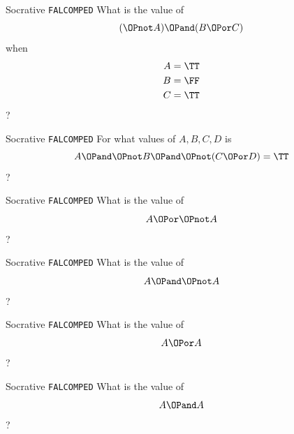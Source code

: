\begin{frame}{Socrative \texttt{FALCOMPED}}
	What is the value of
	$$ (\OPnot A) \OPand (B \OPor C) $$
	when
	\begin{align*}
		A &= \TT \\
		B &= \FF \\
		C &= \TT
	\end{align*}
	?
\end{frame}

\begin{frame}{Socrative \texttt{FALCOMPED}}
	For what values of $A, B, C, D$ is
	$$ A \OPand \OPnot B \OPand \OPnot (C \OPor D) = \TT $$
	?
\end{frame}

\begin{frame}{Socrative \texttt{FALCOMPED}}
	What is the value of
	$$ A \OPor \OPnot A $$
	?
\end{frame}

\begin{frame}{Socrative \texttt{FALCOMPED}}
	What is the value of
	$$ A \OPand \OPnot A $$
	?
\end{frame}

\begin{frame}{Socrative \texttt{FALCOMPED}}
	What is the value of
	$$ A \OPor A $$
	?
\end{frame}

\begin{frame}{Socrative \texttt{FALCOMPED}}
	What is the value of
	$$ A \OPand A $$
	?
\end{frame}


